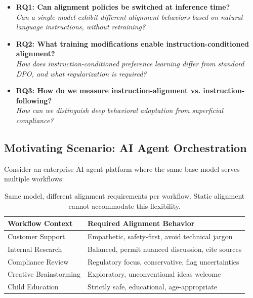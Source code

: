 \vspace{-2mm}
\begin{tcolorbox}[
    colback=Teal!5!White,
    colframe=Teal!55!black,
    title=\textbf{Research Questions},
    fonttitle=\bfseries,
    boxrule=0.5pt,
    arc=2mm,
    left=2mm, right=2mm, top=1mm, bottom=1mm
]
\begin{itemize}[leftmargin=*, itemsep=2pt, topsep=2pt]
    \item[\ding{227}] \textbf{RQ1: Can alignment policies be switched at inference time?}\\
    \textit{Can a single model exhibit different alignment behaviors based on natural language instructions, without retraining?}

    \item[\ding{227}] \textbf{RQ2: What training modifications enable instruction-conditioned alignment?}\\
    \textit{How does instruction-conditioned preference learning differ from standard DPO, and what regularization is required?}

    \item[\ding{227}] \textbf{RQ3: How do we measure instruction-alignment vs. instruction-following?}\\
    \textit{How can we distinguish deep behavioral adaptation from superficial compliance?}
\end{itemize}
\end{tcolorbox}

\vspace{-2mm}
\subsection{Motivating Scenario: AI Agent Orchestration}
\label{sec:motivation}

Consider an enterprise AI agent platform where the same base model serves multiple workflows:

\begin{table}[H]
\centering
\small
\begin{tabularx}{\columnwidth}{@{}lX@{}}
\toprule
\textbf{Workflow Context} & \textbf{Required Alignment Behavior} \\
\midrule
Customer Support & Empathetic, safety-first, avoid technical jargon \\
\hline
Internal Research & Balanced, permit nuanced discussion, cite sources \\
\hline
Compliance Review & Regulatory focus, conservative, flag uncertainties \\
\hline
Creative Brainstorming & Exploratory, unconventional ideas welcome \\
\hline
Child Education & Strictly safe, educational, age-appropriate \\
\bottomrule
\end{tabularx}
\caption{Same model, different alignment requirements per workflow. Static alignment cannot accommodate this flexibility.}
\label{tab:workflow_scenarios}
\vspace{-4mm}
\end{table}


